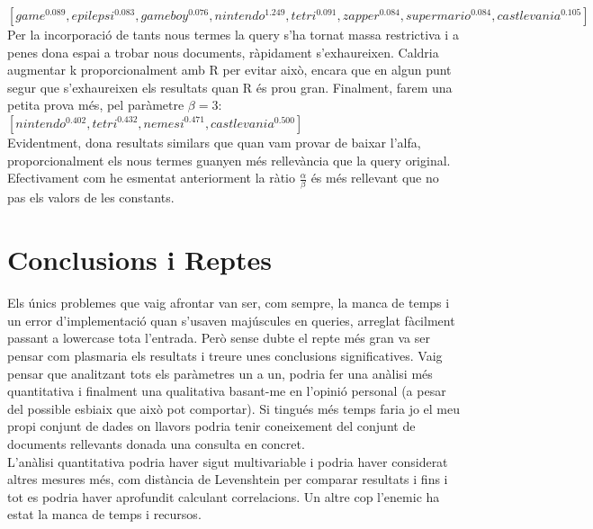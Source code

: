\documentclass[12pt]{article}
\begin{document}
\hspace{-3cm}
$ [game^{0.089}, epilepsi^{0.083}, gameboy^{0.076}, nintendo^{1.249}, tetri^{0.091}, zapper^{0.084}, supermario^{0.084}, castlevania^{0.105}]$
\\ 

Per la incorporació de tants nous termes la query s'ha tornat massa restrictiva i a penes dona espai a trobar nous documents, ràpidament s'exhaureixen. Caldria augmentar k proporcionalment amb R per evitar això, encara que en algun punt segur que s'exhaureixen els resultats quan R és prou gran.
Finalment, farem una petita prova més, pel paràmetre $\beta = 3$:
\\ 

$[nintendo^{0.402}, tetri^{0.432}, nemesi^{0.471}, castlevania^{0.500}]$
\\ 

Evidentment, dona resultats similars que quan vam provar de baixar l'alfa, proporcionalment els nous termes guanyen més rellevància que la query original. Efectivament com he esmentat anteriorment la ràtio $\frac{\alpha}{\beta}$ és més rellevant que no pas els valors de les constants.


\section{Conclusions i Reptes}

Els únics problemes que vaig afrontar van ser, com sempre, la manca de temps i un error d'implementació quan s'usaven majúscules en queries, arreglat fàcilment passant a lowercase tota l'entrada. Però sense dubte el repte més gran va ser pensar com plasmaria els resultats i treure unes conclusions significatives. Vaig pensar que analitzant tots els paràmetres un a un, podria fer una anàlisi més quantitativa i finalment una qualitativa basant-me en l'opinió personal (a pesar del possible esbiaix que això pot comportar). Si tingués més temps faria jo el meu propi conjunt de dades on llavors podria tenir coneixement del conjunt de documents rellevants donada una consulta en concret.
\\

L'anàlisi quantitativa podria haver sigut multivariable i podria haver considerat altres mesures més, com distància de Levenshtein per comparar resultats i fins i tot es podria haver aprofundit calculant correlacions. Un altre cop l'enemic ha estat la manca de temps i recursos.
\\ 
\end{document}
